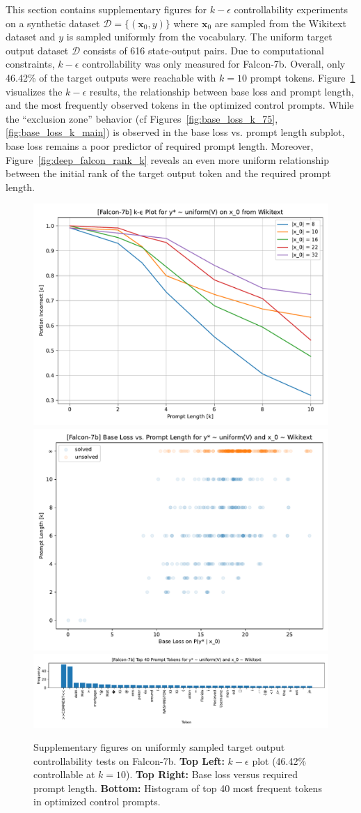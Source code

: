 \documentclass{article} %
\begin{document}
This section contains supplementary figures for $k-\epsilon$ controllability experiments on a synthetic dataset $\mathcal D = \{(\mathbf x_0, y)\}$ where $\mathbf x_0$ are sampled from the Wikitext dataset and $y$ is sampled uniformly from the vocabulary. 
The uniform target output dataset $\mathcal D$ consists of 616 state-output pairs. 
Due to computational constraints, $k-\epsilon$ controllability was only measured for Falcon-7b. 
Overall, only 46.42\% of the target outputs were reachable with $k=10$ prompt tokens. 
Figure~\ref{fig:deep_main} visualizes the $k-\epsilon$ results, the relationship between base loss and prompt length, and the most frequently observed tokens in the optimized control prompts. 
While the ``exclusion zone'' behavior (cf Figures~\ref{fig:base_loss_k_75}, \ref{fig:base_loss_k_main}) is observed in the base loss vs. prompt length subplot, base loss remains a poor predictor of required prompt length. 
Moreover, Figure~\ref{fig:deep_falcon_rank_k} reveals an even more uniform relationship between the initial rank of the target output token and the required prompt length. 

\begin{figure}[htbp]
    \centering
    \includegraphics[width=0.48\linewidth]{figs/deep1_falcon7b_k_epsilon.pdf}
    \hfill
    \includegraphics[width=0.48\linewidth]{figs/deep1_falcon7b_base_loss_vs_prompt_length.pdf}
    \includegraphics[width=\linewidth]{figs/deep1_falcon7b_prompt_token_freqs.pdf}
    \caption{Supplementary figures on uniformly sampled target output controllability tests on Falcon-7b. \textbf{Top Left:} $k-\epsilon$ plot (46.42\% controllable at $k=10$). \textbf{Top Right:} Base loss versus required prompt length. \textbf{Bottom:} Histogram of top 40 most frequent tokens in optimized control prompts.}
    \label{fig:deep_main}
\end{figure}
\end{document}
